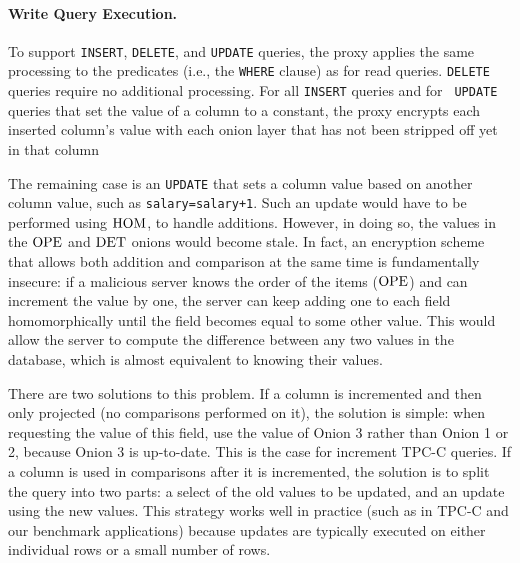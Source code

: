 \paragraph{Write Query Execution.}

To support {\tt INSERT}, {\tt DELETE}, and {\tt UPDATE} queries, the
\name{} proxy applies the same processing to the predicates (i.e., the
{\tt WHERE} clause) as for read queries.  {\tt DELETE} queries require
no additional processing.  For all {\tt INSERT} queries and for {\tt
  UPDATE} queries that set the value of a column to a constant, the
proxy encrypts each inserted column's value with each onion layer that
has not been stripped off yet in that column

The remaining case is an {\tt UPDATE} that sets a column value based
on another column value, such as {\tt salary=salary+1}.  Such an
update would have to be performed using $\textrm{HOM}$, to handle additions.
However, in doing so, the values in the $\textrm{OPE}$ and $\textrm{DET}$ onions would
become stale.  In fact, an encryption scheme that allows both addition
and comparison at the same time is fundamentally insecure: if a
malicious server knows the order of the items ($\textrm{OPE}$) and can
increment the value by one, the server can keep adding one to each
field homomorphically until the field becomes equal to some other
value.  This would allow the server to compute the difference between
any two values in the database, which is almost equivalent to knowing
their values.

There are two solutions to this problem.  If a column is incremented
and then only projected (no comparisons performed on it), the solution
is simple: when requesting the value of this field, use the value of
Onion 3 rather than Onion 1 or 2, because Onion 3 is up-to-date.  This
is the case for increment TPC-C queries.
If a column is used in comparisons after it is
incremented, the solution is to split the query into two parts:
a select of the old values to be updated, and an update using
the new values. 
This strategy works well in practice (such as in TPC-C and our benchmark
applications) because updates are typically executed on either individual
rows or a small number of rows.


